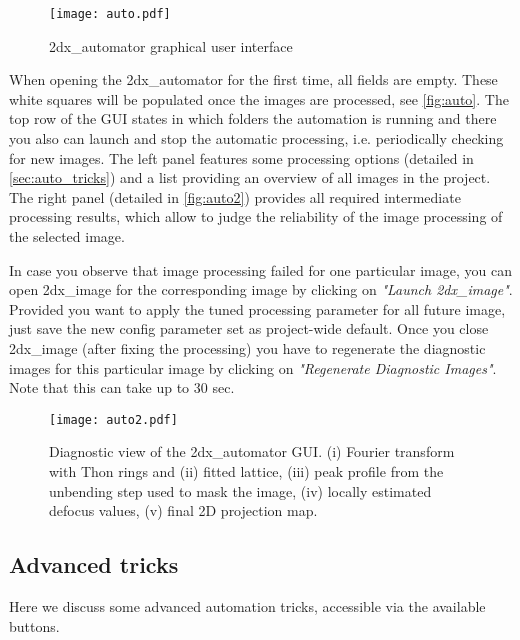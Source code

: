 \begin{figure}
	\centering
	\texttt{[image: auto.pdf]}
	\caption{2dx\_automator graphical user interface}
	\label{fig:auto}
\end{figure}

When opening the 2dx\_automator for the first time, all fields are empty. These white squares will be populated once the images are processed, see \autoref{fig:auto}. The top row of the GUI states in which folders the automation is running and there you also can launch and stop the automatic processing, i.e. periodically checking for new images. The left panel features some processing options (detailed in \autoref{sec:auto_tricks}) and a list providing an overview of all images in the project. The right panel (detailed in \autoref{fig:auto2}) provides all required intermediate processing results, which allow to judge the reliability of the image processing of the selected image. 

In case you observe that image processing failed for one particular image, you can open 2dx\_image for the corresponding image by clicking on \textit{"Launch 2dx\_image"}. Provided you want to apply the tuned processing parameter for all future image, just save the new config parameter set as project-wide default. Once you close 2dx\_image (after fixing the processing) you have to regenerate the diagnostic images for this particular image by clicking on \textit{"Regenerate Diagnostic Images"}. Note that this can take up to 30 sec. 


\begin{figure}
	\centering
	\texttt{[image: auto2.pdf]}
	\caption{Diagnostic view of the 2dx\_automator GUI. (i) Fourier transform with Thon rings and (ii) fitted lattice, (iii) peak profile from the unbending step used to mask the image, (iv) locally estimated defocus values, (v) final 2D projection map.}
	\label{fig:auto2}
\end{figure}


\subsection{Advanced tricks}
\label{sec:auto_tricks}

Here we discuss some advanced automation tricks, accessible via the available buttons.

